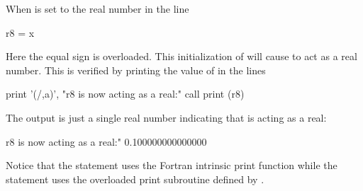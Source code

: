 \documentclass{hitec}     %
\begin{document}
When  is set to the real number  in the line
\begin{example}
    r8 = x
\end{example}
Here the equal sign is overloaded. This initialization of 
will cause  to act as a real number. This is verified by printing the value of  in the lines
\begin{example}
  print '(/,a)', "r8 is now acting as a real:"
  call print (r8)
\end{example}
The output is just a single real number indicating that  is acting as a real:
\begin{example}
  r8 is now acting as a real:"
  0.100000000000000
\end{example}
Notice that the  statement uses the Fortran intrinsic print function while the  statement uses the overloaded print subroutine defined by .
\end{document}
